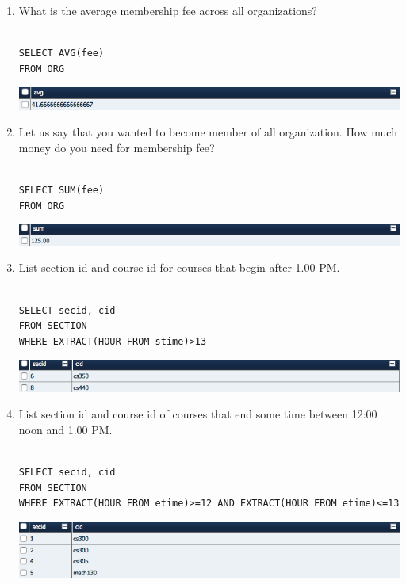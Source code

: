 \documentclass[11pt]{article}
\begin{document}
\begin{enumerate}
\item What is the average membership fee across all organizations?

\begin{verbatim}

SELECT AVG(fee)
FROM ORG

\end{verbatim}

\includegraphics[scale=0.5]{24.png}

\item Let us say that you wanted to become member of all organization. How much money do you need for membership fee?

\begin{verbatim}

SELECT SUM(fee)
FROM ORG

\end{verbatim}

\includegraphics[scale=0.5]{25.png}

\item List section id and course id for courses that begin after 1.00 PM.

\begin{verbatim}

SELECT secid, cid
FROM SECTION
WHERE EXTRACT(HOUR FROM stime)>13

\end{verbatim}

\includegraphics[scale=0.5]{26.png}

\item List section id and course id of courses that end some time between 12:00 noon and 1.00 PM.

\begin{verbatim}

SELECT secid, cid
FROM SECTION
WHERE EXTRACT(HOUR FROM etime)>=12 AND EXTRACT(HOUR FROM etime)<=13

\end{verbatim}

\includegraphics[scale=0.5]{27.png}


\end{enumerate}
\end{document}
